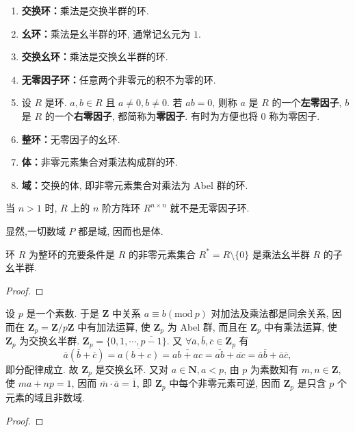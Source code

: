 \documentclass[../../main.tex]{subfiles}
\begin{document}
\begin{definition}
\begin{enumerate}
\item \textbf{交换环：}乘法是交换半群的环.

\item \textbf{幺环：}乘法是幺半群的环, 通常记幺元为 \( 1 \).

\item \textbf{交换幺环：}乘法是交换幺半群的环.

\item \textbf{无零因子环：}任意两个非零元的积不为零的环.

\item 设 \( R \) 是环. \( a,b \in R \) 且 \( a \neq 0, b \neq 0 \). 若 \( ab = 0 \), 则称 \( a \) 是 \( R \) 的一个\textbf{左零因子}, \( b \) 是 \( R \) 的一个\textbf{右零因子}, 都简称为\textbf{零因子}. 有时为方便也将 \( 0 \) 称为零因子. 
\item \textbf{整环：}无零因子的幺环.

\item \textbf{体：}非零元素集合对乘法构成群的环.

\item \textbf{域：}交换的体, 即非零元素集合对乘法为 Abel 群的环.
\end{enumerate}
\end{definition}
\begin{remark}
当 \( n > 1 \) 时, \( R \) 上的 \( n \) 阶方阵环 \( R^{n \times n} \) 就不是无零因子环.

显然,一切数域 \( P \) 都是域, 因而也是体.
\end{remark}

\begin{proposition}
环 \( R \) 为整环的充要条件是 \( R \) 的非零元素集合 \( R^* = R \setminus \{0\} \) 是乘法幺半群 \( R \) 的子幺半群.
\end{proposition}
\begin{proof}


\end{proof}

\begin{example}
设 \( p \) 是一个素数. 于是 \( \mathbf{Z} \) 中关系 \( a \equiv b(\text{mod}\ p) \) 对加法及乘法都是同余关系, 因而在 \( \mathbf{Z}_p = \mathbf{Z}/p\mathbf{Z} \) 中有加法运算, 使 \( \mathbf{Z}_p \) 为 Abel 群, 而且在 \( \mathbf{Z}_p \) 中有乘法运算, 使 \( \mathbf{Z}_p \) 为交换幺半群. \( \mathbf{Z}_p = \{0,1,\cdots,\overline{p-1}\} \). 又 \( \forall \overline{a},\overline{b},\overline{c} \in \mathbf{Z}_p \) 有
\[
\overline{a}(\overline{b} + \overline{c}) = \overline{a(b + c)} = \overline{ab + ac} = \overline{ab} + \overline{ac} = \overline{a}\overline{b} + \overline{a}\overline{c},
\]
即分配律成立. 故 \( \mathbf{Z}_p \) 是交换幺环. 又对 \( a \in \mathbf{N}, a < p \), 由 \( p \) 为素数知有 \( m,n \in \mathbf{Z} \), 使 \( ma + np = 1 \), 因而 \( \overline{m} \cdot \overline{a} = \overline{1} \), 即 \( \mathbf{Z}_p \) 中每个非零元素可逆, 因而 \( \mathbf{Z}_p \) 是只含 \( p \) 个元素的域且非数域.
\end{example}
\begin{proof}


\end{proof}
\end{document}
